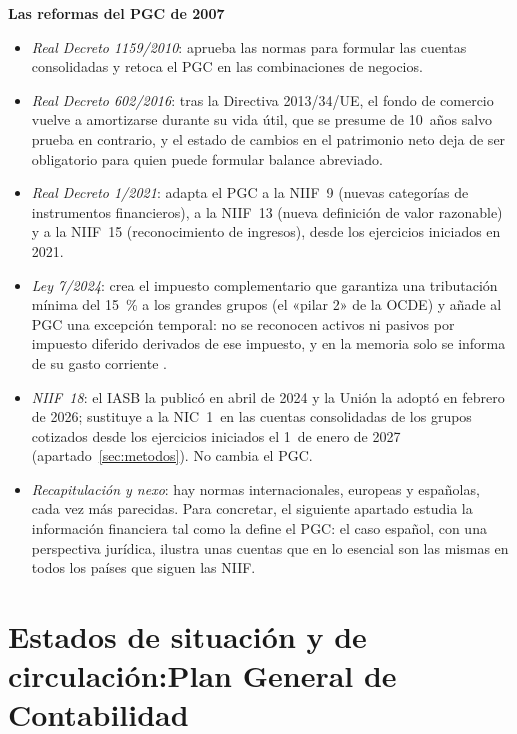 \documentclass[11pt]{article}
\begin{document}
\begin{anotaciones}
\textbf{Las reformas del PGC de 2007}
\begin{itemize}
\item \emph{Real Decreto 1159/2010}: aprueba las normas para formular las cuentas consolidadas y retoca el PGC en las combinaciones de negocios\nocite{BOE2010NOFCAC}.
\item \emph{Real Decreto 602/2016}: tras la Directiva 2013/34/UE, el fondo de comercio vuelve a amortizarse durante su vida útil, que se presume de 10~años salvo prueba en contrario, y el estado de cambios en el patrimonio neto deja de ser obligatorio para quien puede formular balance abreviado\nocite{BOE2016RD602}.
\item \emph{Real Decreto 1/2021}: adapta el PGC a la NIIF~9 (nuevas categorías de instrumentos financieros), a la NIIF~13 (nueva definición de valor razonable) y a la NIIF~15 (reconocimiento de ingresos), desde los ejercicios iniciados en 2021\nocite{BOE2021RD1}.
\item \emph{Ley 7/2024}: crea el impuesto complementario que garantiza una tributación mínima del 15~\% a los grandes grupos (el «pilar 2» de la OCDE) y añade al PGC una excepción temporal: no se reconocen activos ni pasivos por impuesto diferido derivados de ese impuesto, y en la memoria solo se informa de su gasto corriente \nocite{BOE2024Ley7}.
\item \emph{NIIF~18}: el IASB la publicó en abril de 2024 y la Unión la adoptó en febrero de 2026; sustituye a la NIC~1~en las cuentas consolidadas de los grupos cotizados desde los ejercicios iniciados el 1~de enero de 2027 (apartado~\ref{sec:metodos})\nocite{IASB2024NIIF18,UE2026NIIF18}. No cambia el PGC.
\end{itemize}
\end{anotaciones}

\begin{itemize}
\item \emph{Recapitulación y nexo}: hay normas internacionales, europeas y españolas, cada vez más parecidas. Para concretar, el siguiente apartado estudia la información financiera tal como la define el PGC: el caso español, con una perspectiva jurídica, ilustra unas cuentas que en lo esencial son las mismas en todos los países que siguen las NIIF.
\end{itemize}

\section{Estados de situación y de circulación:\cortetitulo Plan General de Contabilidad}\label{sec:pgc}
\end{document}

